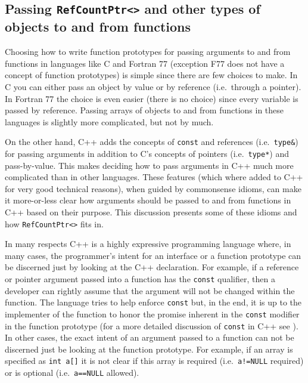 %
\subsection{Passing {}\texttt{RefCountPtr<>} and other types of objects to and from functions}
\label{rcp:sec:passing-args}
%

Choosing how to write function prototypes for passing arguments to and
from functions in languages like C and Fortran 77 (exception F77 does
not have a concept of function prototypes) is simple since there are
few choices to make.  In C you can either pass an object by value or
by reference (i.e.~through a pointer).  In Fortran 77 the choice is
even easier (there is no choice) since every variable is passed by
reference.  Passing arrays of objects to and from functions in these
languages is slightly more complicated, but not by much.

On the other hand, C++ adds the concepts of {}\texttt{const} and
references (i.e.~{}\texttt{type\&}) for passing arguments in addition
to C's concepts of pointers (i.e.~{}\texttt{type*}) and pass-by-value.
This makes deciding how to pass arguments in C++ much more complicated
than in other languages.  These features (which where added to C++ for
very good technical reasons), when guided by commonsense idioms, can
make it more-or-less clear how arguments should be passed to and from
functions in C++ based on their purpose.  This discussion presents
some of these idioms and how {}\texttt{RefCountPtr<>} fits in.

In many respects C++ is a highly expressive programming language
where, in many cases, the programmer's intent for an interface or a
function prototype can be discerned just by looking at the C++
declaration.  For example, if a reference or pointer argument passed
into a function has the {}\texttt{const} qualifier, then a developer
can rightly assume that the argument will not be changed within the
function.  The language tries to help enforce {}\texttt{const} but, in
the end, it is up to the implementer of the function to honor the
promise inherent in the {}\texttt{const} modifier in the function
prototype (for a more detailed discussion of {}\texttt{const} in C++
see {}\cite[Section 10.2.7.1]{ref:stroustrup_2000}).  In other cases,
the exact intent of an argument passed to a function can not be
discerned just be looking at the function prototype.  For example, if
an array is specified as {}\texttt{int a[]} it is not clear if this
array is required (i.e.~{}\texttt{a!=NULL} required) or is optional
(i.e.~{}\texttt{a==NULL} allowed).

